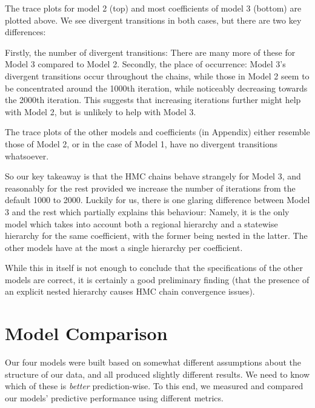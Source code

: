 \documentclass[12pt]{article}
\begin{document}
The trace plots for model 2 (top) and most coefficients of model 3 (bottom) are plotted above. We see divergent transitions in both cases, but there are two key differences:

Firstly, the number of divergent transitions: There are many more of these for Model 3 compared to Model 2. Secondly, the place of occurrence: Model 3's divergent transitions occur throughout the chains, while those in Model 2 seem to be concentrated around the 1000th iteration, while noticeably decreasing towards the 2000th iteration. This suggests that increasing iterations further might help with Model 2, but is unlikely to help with Model 3.

The trace plots of the other models and coefficients (in Appendix) either resemble those of Model 2, or in the case of Model 1, have no divergent transitions whatsoever.

So our key takeaway is that the HMC chains behave strangely for Model 3, and reasonably for the rest provided we increase the number of iterations from the default 1000 to 2000. Luckily for us, there is one glaring difference between Model 3 and the rest which partially explains this behaviour: Namely, it is the only model which takes into account both a regional hierarchy and a statewise hierarchy for the same coefficient, with the former being nested in the latter. The other models have at the most a single hierarchy per coefficient. 

While this in itself is not enough to conclude that the specifications of the other models are correct, it is certainly a good preliminary finding (that the presence of an explicit nested hierarchy causes HMC chain convergence issues). 


\section{Model Comparison} \label{sec:comparison}


Our four models were built based on somewhat different assumptions about the structure of our data, and all produced slightly different results. We need to know which of these is \textit{better} prediction-wise.
To this end, we measured and compared our models' predictive performance using different metrics. %
\end{document}
